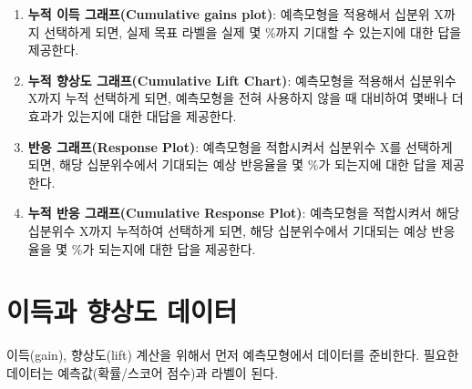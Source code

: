 \documentclass[
  letterpaper,
  chapter,a4paper,showtrims,openright,hidelinks]{oblivoir}
\providecommand{\tightlist}{%
  \setlength{\itemsep}{0pt}\setlength{\parskip}{0pt}}\usepackage{longtable,booktabs,array}
\begin{document}
\begin{enumerate}
\def\labelenumi{\arabic{enumi}.}
\tightlist
\item
  \textbf{누적 이득 그래프(Cumulative gains plot)}: 예측모형을 적용해서
  십분위 X까지 선택하게 되면, 실제 목표 라벨을 실제 몇 \%까지 기대할 수
  있는지에 대한 답을 제공한다.
\item
  \textbf{누적 향상도 그래프(Cumulative Lift Chart)}: 예측모형을
  적용해서 십분위수 X까지 누적 선택하게 되면, 예측모형을 전혀 사용하지
  않을 때 대비하여 몇배나 더 효과가 있는지에 대한 대답을 제공한다.
\item
  \textbf{반응 그래프(Response Plot)}: 예측모형을 적합시켜서 십분위수
  X를 선택하게 되면, 해당 십분위수에서 기대되는 예상 반응율을 몇 \%가
  되는지에 대한 답을 제공한다.
\item
  \textbf{누적 반응 그래프(Cumulative Response Plot)}: 예측모형을
  적합시켜서 해당 십분위수 X까지 누적하여 선택하게 되면, 해당
  십분위수에서 기대되는 예상 반응율을 몇 \%가 되는지에 대한 답을
  제공한다.
\end{enumerate}

\hypertarget{predictive-model-caret-business-dataset}{%
\section{이득과 향상도
데이터}\label{predictive-model-caret-business-dataset}}

이득(gain), 향상도(lift) 계산을 위해서 먼저 예측모형에서 데이터를
준비한다. 필요한 데이터는 예측값(확률/스코어 점수)과 라벨이 된다.
\end{document}
